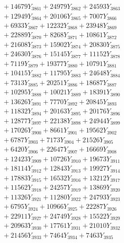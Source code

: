 \documentclass[a4paper,10pt]{article}
\begin{document}
{\begin{align}
&\;  + 14679 Y_{3861} + 24979 Y_{3862} + 24593 Y_{3863} \\[0.3ex]
&\;  + 12949 Y_{3864} + 20106 Y_{3865} + 7007 Y_{3866} \\[0.3ex]
&\;  + 6933 Y_{3867} + 12232 Y_{3868} + 23948 Y_{3869} \\[0.5ex]\allowbreak
&\;  + 22889 Y_{3870} + 8268 Y_{3871} + 10861 Y_{3872} \\[0.3ex]
&\;  + 21608 Y_{3873} + 15902 Y_{3874} + 20830 Y_{3875} \\[0.3ex]
&\;  + 24630 Y_{3876} + 15145 Y_{3877} + 11152 Y_{3878} \\[0.3ex]
&\;  + 7119 Y_{3879} + 19377 Y_{3880} + 10791 Y_{3881} \\[0.3ex]
&\;  + 10415 Y_{3882} + 11795 Y_{3883} + 24648 Y_{3884} \\[0.3ex]
&\;  + 7313 Y_{3885} + 20251 Y_{3886} + 18687 Y_{3887} \\[0.3ex]
&\;  + 10295 Y_{3888} + 10021 Y_{3889} + 18391 Y_{3890} \\[0.3ex]
&\;  + 13626 Y_{3891} + 7770 Y_{3892} + 20845 Y_{3893} \\[0.3ex]
&\;  + 11832 Y_{3894} + 20163 Y_{3895} + 20176 Y_{3896} \\[0.3ex]
&\;  + 12877 Y_{3897} + 22138 Y_{3898} + 24944 Y_{3899} \\[0.5ex]\allowbreak
&\;  + 17026 Y_{3900} + 8661 Y_{3901} + 19562 Y_{3902} \\[0.3ex]
&\;  + 6787 Y_{3903} + 7173 Y_{3904} + 21526 Y_{3905} \\[0.3ex]
&\;  + 6420 Y_{3906} + 22647 Y_{3907} + 16669 Y_{3908} \\[0.3ex]
&\;  + 12423 Y_{3909} + 10726 Y_{3910} + 19673 Y_{3911} \\[0.3ex]
&\;  + 18114 Y_{3912} + 12843 Y_{3913} + 19927 Y_{3914} \\[0.3ex]
&\;  + 17883 Y_{3915} + 16532 Y_{3916} + 13212 Y_{3917} \\[0.3ex]
&\;  + 11562 Y_{3918} + 24257 Y_{3919} + 13869 Y_{3920} \\[0.3ex]
&\;  + 11326 Y_{3921} + 11280 Y_{3922} + 24793 Y_{3923} \\[0.3ex]
&\;  + 6795 Y_{3924} + 10966 Y_{3925} + 22287 Y_{3926} \\[0.3ex]
&\;  + 22911 Y_{3927} + 24749 Y_{3928} + 15522 Y_{3929} \\[0.5ex]\allowbreak
&\;  + 20963 Y_{3930} + 17761 Y_{3931} + 21010 Y_{3932} \\[0.3ex]
&\;  + 21456 Y_{3933} + 7464 Y_{3934} + 7463 Y_{3935} \\[0.3ex]

\end{align}}
\end{document}
